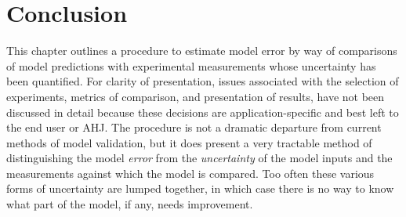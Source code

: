 \section{Conclusion}

This chapter outlines a procedure to estimate model error by way of comparisons of model predictions with experimental measurements whose uncertainty has been
quantified. For clarity of presentation, issues associated with the selection of experiments, metrics of comparison, and presentation of results, have not been
discussed in detail because these decisions are application-specific and best left to the end user or AHJ. The procedure is not a dramatic departure from current
methods of model validation, but it does present a very tractable method of distinguishing the model {\em error} from the {\em uncertainty} of the model inputs and the measurements
against which the model is compared. Too often these various forms of uncertainty are lumped together, in which case there is no way to know what part of the model, if
any, needs improvement.
